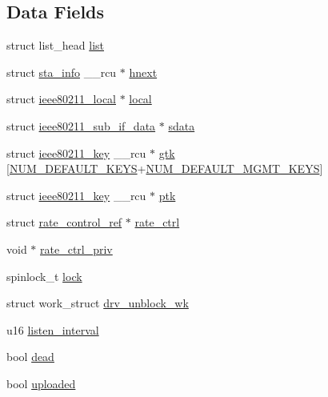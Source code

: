 \subsection*{Data Fields}
\begin{DoxyCompactItemize}
\item 
struct list\-\_\-head \hyperlink{structsta__info_a1f00f18b91d5a820f2c43064243aa86e}{list}
\item 
struct \hyperlink{structsta__info}{sta\-\_\-info} \-\_\-\-\_\-rcu $\ast$ \hyperlink{structsta__info_aa178703df252667045be48a8874eec89}{hnext}
\item 
struct \hyperlink{structieee80211__local}{ieee80211\-\_\-local} $\ast$ \hyperlink{structsta__info_ad436a024f420f219c4fe2eebce7e4ab2}{local}
\item 
struct \hyperlink{structieee80211__sub__if__data}{ieee80211\-\_\-sub\-\_\-if\-\_\-data} $\ast$ \hyperlink{structsta__info_ad829d8d33f06a7245cc303f924f259ac}{sdata}
\item 
struct \hyperlink{structieee80211__key}{ieee80211\-\_\-key} \-\_\-\-\_\-rcu $\ast$ \hyperlink{structsta__info_ac5aa183bc3b32140826a8d0fcbad185e}{gtk} \mbox{[}\hyperlink{key_8h_afc56a6aebd37a90bca92708898c4e80a}{N\-U\-M\-\_\-\-D\-E\-F\-A\-U\-L\-T\-\_\-\-K\-E\-Y\-S}+\hyperlink{key_8h_a7cb10042c995311e0b4dfa6a8cabdd11}{N\-U\-M\-\_\-\-D\-E\-F\-A\-U\-L\-T\-\_\-\-M\-G\-M\-T\-\_\-\-K\-E\-Y\-S}\mbox{]}
\item 
struct \hyperlink{structieee80211__key}{ieee80211\-\_\-key} \-\_\-\-\_\-rcu $\ast$ \hyperlink{structsta__info_a20cca2acd1f1b3a9435094e1f0b73092}{ptk}
\item 
struct \hyperlink{structrate__control__ref}{rate\-\_\-control\-\_\-ref} $\ast$ \hyperlink{structsta__info_a0f6ac21a75ada1908328210ec3b42667}{rate\-\_\-ctrl}
\item 
void $\ast$ \hyperlink{structsta__info_a4212dd3a8398e8cd2ccb74821fc2fad0}{rate\-\_\-ctrl\-\_\-priv}
\item 
spinlock\-\_\-t \hyperlink{structsta__info_a79cda015c79ff2b4c1444e3070f0bb5d}{lock}
\item 
struct work\-\_\-struct \hyperlink{structsta__info_a2c95e461fff888fae360c7a55a151223}{drv\-\_\-unblock\-\_\-wk}
\item 
u16 \hyperlink{structsta__info_a778b871f4950f5c807895a3267025b6c}{listen\-\_\-interval}
\item 
bool \hyperlink{structsta__info_a79810da189102ac7036cb8eca47d104d}{dead}
\item 
bool \hyperlink{structsta__info_a5a978acf843365688119db95ca4ba0b1}{uploaded}

\end{DoxyCompactItemize}
